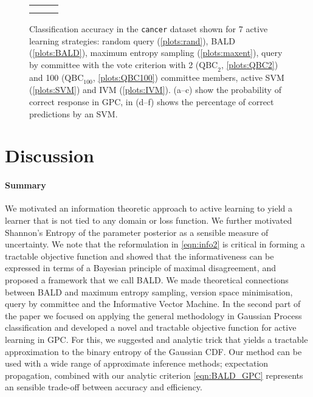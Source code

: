 \documentclass[twoside]{article}
\begin{document}
\begin{figure*}
\begin{center}
\begin{tabular}{rrr}
&
&
\\
&
&
\\
\end{tabular}
\end{center}
\caption{Classification accuracy in the \texttt{cancer} dataset shown for 7 active learning strategies:
random query (\ref{plots:rand}), BALD (\ref{plots:BALD}),  maximum entropy
sampling (\ref{plots:maxent}), query by committee with the vote criterion with
2 ($\mbox{QBC}_2$, \ref{plots:QBC2}) and 100 ($\mbox{QBC}_{100}$,
\ref{plots:QBC100}) committee members, active SVM (\ref{plots:SVM}) and IVM (\ref{plots:IVM}).
(a--c) show the probability of correct response in GPC, in (d--f) shows the percentage of correct predictions by an SVM.}
\label{fig:cancer}
\end{figure*}

\section{Discussion}

\paragraph{Summary} We motivated an information theoretic approach to active learning to yield a learner that is not tied to any domain or loss function. We further motivated Shannon's Entropy of the parameter posterior as a sensible measure of uncertainty.  We note that the reformulation in \eqref{eqn:info2} is critical in forming a tractable objective function and showed that the informativeness can be expressed in terms of a Bayesian principle of maximal disagreement, and proposed a framework that we call BALD.  We made theoretical connections between BALD and maximum entropy sampling, version space minimisation, query by committee and the Informative Vector Machine.  In the second part of the paper we focused on applying the general methodology in Gaussian Process classification and developed a novel and tractable objective function for active learning in GPC. For this, we suggested and analytic trick that yields a tractable approximation to the binary entropy of the Gaussian CDF. Our method can be used with a wide range of approximate inference methods; expectation propagation, combined with our analytic criterion \eqref{eqn:BALD_GPC} represents an sensible trade-off between accuracy and efficiency.
\end{document}
